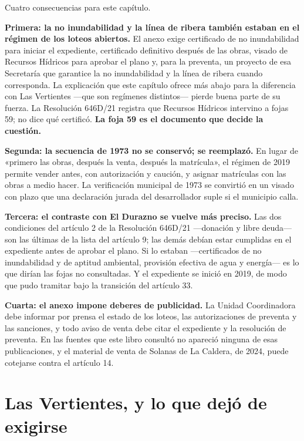 \begin{cautela}
Cuatro consecuencias para este capítulo.

\textbf{Primera: la no inundabilidad y la línea de ribera también estaban en el régimen de los loteos abiertos.} El anexo exige certificado de no inundabilidad para iniciar el expediente, certificado definitivo después de las obras, visado de Recursos Hídricos para aprobar el plano y, para la preventa, un proyecto de esa Secretaría que garantice la no inundabilidad y la línea de ribera cuando corresponda. La explicación que este capítulo ofrece más abajo para la diferencia con Las Vertientes ---que son regímenes distintos--- pierde buena parte de su fuerza. La Resolución 646D/21 registra que Recursos Hídricos intervino a fojas 59; no dice qué certificó. \textbf{La foja 59 es el documento que decide la cuestión.}

\textbf{Segunda: la secuencia de 1973 no se conservó; se reemplazó.} En lugar de «primero las obras, después la venta, después la matrícula», el régimen de 2019 permite vender antes, con autorización y caución, y asignar matrículas con las obras a medio hacer. La verificación municipal de 1973 se convirtió en un visado con plazo que una declaración jurada del desarrollador suple si el municipio calla.

\textbf{Tercera: el contraste con El Durazno se vuelve más preciso.} Las dos condiciones del artículo 2 de la Resolución 646D/21 ---donación y libre deuda--- son las últimas de la lista del artículo 9; las demás debían estar cumplidas en el expediente antes de aprobar el plano. Si lo estaban ---certificados de no inundabilidad y de aptitud ambiental, provisión efectiva de agua y energía--- es lo que dirían las fojas no consultadas. Y el expediente se inició en 2019, de modo que pudo tramitar bajo la transición del artículo 33.

\textbf{Cuarta: el anexo impone deberes de publicidad.} La Unidad Coordinadora debe informar por prensa el estado de los loteos, las autorizaciones de preventa y las sanciones, y todo aviso de venta debe citar el expediente y la resolución de preventa. En las fuentes que este libro consultó no apareció ninguna de esas publicaciones, y el material de venta de Solanas de La Caldera, de 2024, puede cotejarse contra el artículo 14.
\end{cautela}

\section{Las Vertientes, y lo que dejó de exigirse}


